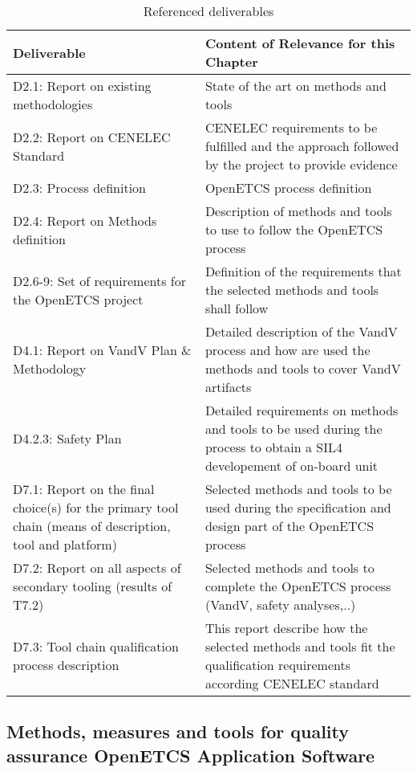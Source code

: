 \documentclass{template/openetcs_article}
\begin{document}
\begin{table}[H]
\begin{supertabular}{|m{3cm}|m{11cm}|}
\hline
{}
Deliverable &
Content of Relevance for this Chapter\\\hline
D2.1: Report on existing methodologies &
State of the art on methods and tools \\\hline
D2.2: Report on CENELEC Standard &
CENELEC requirements to be fulfilled and the approach followed by the project to provide evidence\\\hline
D2.3: Process definition &
OpenETCS process definition \\\hline
D2.4: Report on Methods definition &
Description of methods and tools to use to follow the OpenETCS process \\\hline
D2.6-9: Set of requirements for the OpenETCS project &
Definition of the requirements that the selected methods and tools shall follow \\\hline
D4.1: Report on \gls{VandV} Plan \& Methodology &
Detailed description of the \gls{VandV} process and how are used the methods and tools to cover \gls{VandV} artifacts \\\hline
D4.2.3: Safety Plan &
Detailed requirements on methods and tools to be used during the process to obtain a \gls{SIL}4 developement of \gls{on-board unit} \\\hline
D7.1: Report on the final choice(s) for the primary tool chain (means of description, tool and platform) &
Selected methods and tools to be used during the specification and design part of the OpenETCS process \\\hline
D7.2: Report on all aspects of secondary tooling (results of T7.2)  &
Selected methods and tools to complete the OpenETCS process (\gls{VandV}, safety analyses,..) \\\hline
D7.3: Tool chain qualification process description &
This report describe how the selected methods and tools fit the qualification requirements according CENELEC standard \\\hline
\end{supertabular}
\caption{Referenced deliverables}
\end{table}


\subsection{Methods, measures and tools for quality assurance OpenETCS Application Software}
\end{document}
